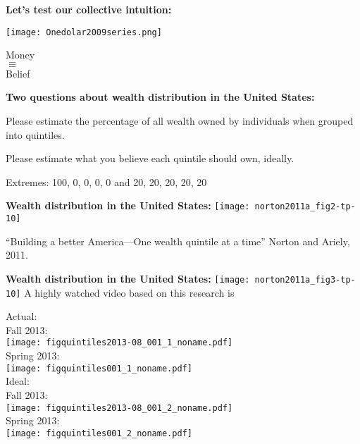   \textbf{Let's test our collective intuition:}

  
      
      
      \texttt{[image: Onedolar2009series.png]}
      
      Money \\
      $\equiv$ \\
      Belief
      
      

  \textbf{Two questions about wealth distribution in the United States:}
    
    
      Please estimate the percentage of all wealth 
      owned by individuals when grouped into quintiles.
    
      Please estimate what you believe each quintile
      should own, ideally.
    
      Extremes: 100, 0, 0, 0, 0 and 20, 20, 20, 20, 20
    
  
  


  \textbf{\small Wealth distribution in the United States:\cite{norton2011a}}
    \texttt{[image: norton2011a\_fig2-tp-10]}
  
  \small
  ``Building a better America---One wealth quintile at a time''\newline
  Norton and Ariely, 2011.\cite{norton2011a}
  


  \textbf{\small Wealth distribution in the United States:\cite{norton2011a}}
    \texttt{[image: norton2011a\_fig3-tp-10]}
    \small
    \small
    A highly watched video based on this research is
  
  


      
    
    Actual:\\
    {\small Fall 2013:}\\
    \texttt{[image: figquintiles2013-08\_001\_1\_noname.pdf]}\\
    {\small Spring 2013:}\\
    \texttt{[image: figquintiles001\_1\_noname.pdf]}\\
    
    
    
    Ideal:\\
    {\small Fall 2013:}\\
    \texttt{[image: figquintiles2013-08\_001\_2\_noname.pdf]}\\
    {\small Spring 2013:}\\
    \texttt{[image: figquintiles001\_2\_noname.pdf]}\\
    
